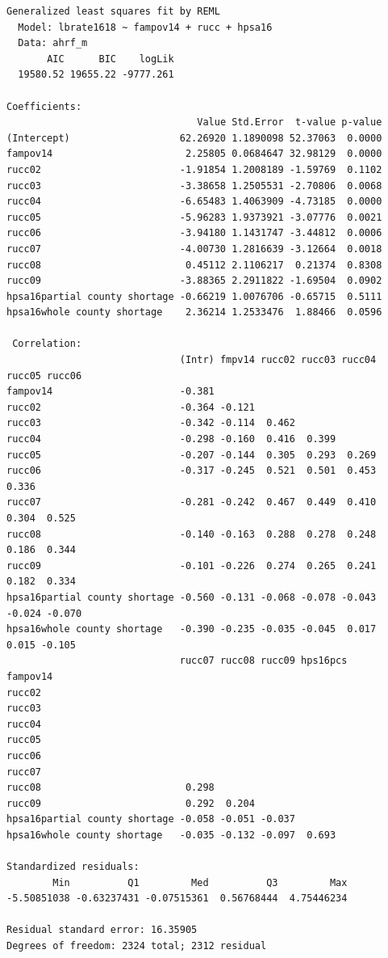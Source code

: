 \documentclass[
  letterpaper,
  DIV=11,
  numbers=noendperiod]{scrreprt}
\begin{document}
\begin{verbatim}
Generalized least squares fit by REML
  Model: lbrate1618 ~ fampov14 + rucc + hpsa16 
  Data: ahrf_m 
       AIC      BIC    logLik
  19580.52 19655.22 -9777.261

Coefficients:
                                 Value Std.Error  t-value p-value
(Intercept)                   62.26920 1.1890098 52.37063  0.0000
fampov14                       2.25805 0.0684647 32.98129  0.0000
rucc02                        -1.91854 1.2008189 -1.59769  0.1102
rucc03                        -3.38658 1.2505531 -2.70806  0.0068
rucc04                        -6.65483 1.4063909 -4.73185  0.0000
rucc05                        -5.96283 1.9373921 -3.07776  0.0021
rucc06                        -3.94180 1.1431747 -3.44812  0.0006
rucc07                        -4.00730 1.2816639 -3.12664  0.0018
rucc08                         0.45112 2.1106217  0.21374  0.8308
rucc09                        -3.88365 2.2911822 -1.69504  0.0902
hpsa16partial county shortage -0.66219 1.0076706 -0.65715  0.5111
hpsa16whole county shortage    2.36214 1.2533476  1.88466  0.0596

 Correlation: 
                              (Intr) fmpv14 rucc02 rucc03 rucc04 rucc05 rucc06
fampov14                      -0.381                                          
rucc02                        -0.364 -0.121                                   
rucc03                        -0.342 -0.114  0.462                            
rucc04                        -0.298 -0.160  0.416  0.399                     
rucc05                        -0.207 -0.144  0.305  0.293  0.269              
rucc06                        -0.317 -0.245  0.521  0.501  0.453  0.336       
rucc07                        -0.281 -0.242  0.467  0.449  0.410  0.304  0.525
rucc08                        -0.140 -0.163  0.288  0.278  0.248  0.186  0.344
rucc09                        -0.101 -0.226  0.274  0.265  0.241  0.182  0.334
hpsa16partial county shortage -0.560 -0.131 -0.068 -0.078 -0.043 -0.024 -0.070
hpsa16whole county shortage   -0.390 -0.235 -0.035 -0.045  0.017  0.015 -0.105
                              rucc07 rucc08 rucc09 hps16pcs
fampov14                                                   
rucc02                                                     
rucc03                                                     
rucc04                                                     
rucc05                                                     
rucc06                                                     
rucc07                                                     
rucc08                         0.298                       
rucc09                         0.292  0.204                
hpsa16partial county shortage -0.058 -0.051 -0.037         
hpsa16whole county shortage   -0.035 -0.132 -0.097  0.693  

Standardized residuals:
        Min          Q1         Med          Q3         Max 
-5.50851038 -0.63237431 -0.07515361  0.56768444  4.75446234 

Residual standard error: 16.35905 
Degrees of freedom: 2324 total; 2312 residual
\end{verbatim}
\end{document}

